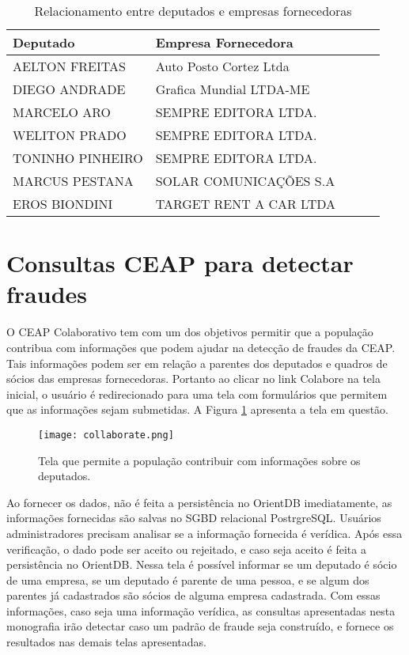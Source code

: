 \begin{table}[h!]
\centering
\caption{Relacionamento entre deputados e empresas fornecedoras}
\begin{tabular}{|l|l|l|l|l|}
\hline
Deputado & Empresa Fornecedora \\ \hline
AELTON FREITAS & Auto Posto Cortez Ltda \\ \hline
DIEGO ANDRADE & Grafica Mundial LTDA-ME \\ \hline
MARCELO ARO & SEMPRE EDITORA LTDA. \\ \hline
WELITON PRADO & SEMPRE EDITORA LTDA. \\ \hline
TONINHO PINHEIRO & SEMPRE EDITORA LTDA. \\ \hline
MARCUS PESTANA & SOLAR COMUNICAÇÕES S.A \\ \hline
EROS BIONDINI & TARGET RENT A CAR LTDA \\ \hline
\end{tabular}
\label{table:relation_deputies_companies}
\end{table}

\section{Consultas CEAP para detectar fraudes}

O CEAP Colaborativo tem com um dos objetivos permitir que a população contribua com informações que podem ajudar na detecção de fraudes da CEAP. Tais informações podem ser em relação a parentes dos deputados e quadros de sócios das empresas fornecedoras. Portanto ao clicar no link Colabore na tela inicial, o usuário é redirecionado para uma tela com formulários que permitem que as informações sejam submetidas. A Figura \ref{fig:collaborate} apresenta a tela em questão.

\begin{figure}[H]
\centering
\texttt{[image: collaborate.png]}
\caption{Tela que permite a população contribuir com informações sobre os deputados.}
\label{fig:collaborate}
\end{figure}

Ao fornecer os dados, não é feita a persistência no OrientDB imediatamente, as informações fornecidas são salvas no SGBD relacional PostrgreSQL. Usuários administradores precisam analisar se a informação fornecida é verídica. Após essa verificação, o dado pode ser aceito ou rejeitado, e caso seja aceito é feita a persistência no OrientDB. Nessa tela é possível informar se um deputado é sócio de uma empresa, se um deputado é parente de uma pessoa, e se algum dos parentes já cadastrados são sócios de alguma empresa cadastrada. Com essas informações, caso seja uma informação verídica, as consultas apresentadas nesta monografia irão detectar caso um padrão de fraude seja construído, e fornece os resultados nas demais telas apresentadas.

